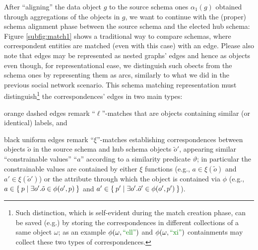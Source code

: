 \begin{example}[continues=ex:examplegraphdata,label=ex:examplereferencedOcaml]
After ``aligning'' the data object $g$ to the source schema ones $\alpha_1(g)$ obtained through aggregations of the objects in $g$, we want to continue with the (proper) schema alignment phase between the source schema and the elected hub schema: Figure \ref{subfig:match1} shows a traditional way to compare schemas, where correspondent entities are matched (even with this case) with an edge. Please also note that edges may be represented as nested graphs' edges and hence as objects even though, for representational ease, we distinguish such obects from the schema ones by representing them as arcs, similarly to what we did in the previous social network scenario. This schema matching representation must  distinguish\footnote{Such distinction, which is self-evident during the match creation phase, can be saved (e.g.) by storing the correspondences in different collections of a same object $\omega$; as an example $\phi(\omega,\mstr{ell})$ and $\phi(\omega,\mstr{xi})$ containments may collect these two types of correspondences.} the correspondences' edges in two main types: 
\begin{myalist}
\item orange dashed edges remark ``$\ell$''-matches that are objects containing similar (or identical) labels, and 
\item black uniform edges remark ``$\xi$''-matches establishing correspondences between %
objects $\tilde{o}$ in the source schema %
 and hub schema objects $\tilde{o}'$, appearing similar ``constrainable values'' ``$a$'' according to a similarity predicate $\vartheta$; in particular the constrainable values are contained by either $\xi$ functions (e.g.,  $a\in\xi(\tilde{o})$ and $a'\in\xi(\tilde{o}')$) or the attribute through which the object is contained via $\phi$  (e.g., $a\in\Set{p| \exists o'.\tilde{o}\in \phi(o',p)}$ and $a'\in\Set{p'| \exists o'.\tilde{o}'\in \phi(o',p')}$).
\end{myalist}

\end{example}
